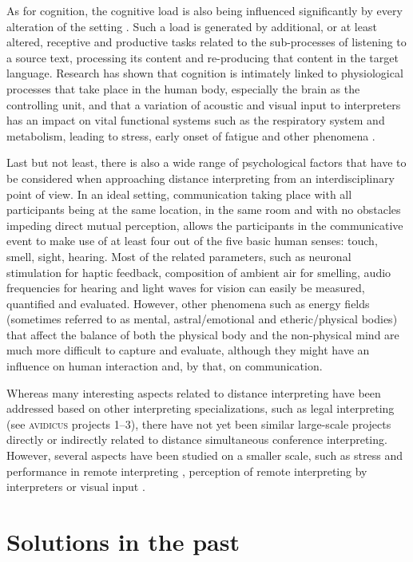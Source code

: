 \documentclass[output=paper]{langsci/langscibook}
\begin{document}
As for cognition, the cognitive load is also being influenced significantly by every alteration of the setting \citep{Moser-Mercer2005}. Such a load is generated by additional, or at least altered, receptive and productive tasks related to the sub-processes of listening to a source text, processing its content and re-producing that content in the target language. Research has shown that cognition is intimately linked to physiological processes that take place in the human body, especially the brain as the controlling unit, and that a variation of acoustic and visual input to interpreters has an impact on vital functional systems such as the respiratory system and metabolism, leading to stress, early onset of fatigue and other phenomena \citep{Moser-Mercer2003}.

Last but not least, there is also a wide range of psychological factors that have to be considered when approaching distance interpreting from an interdisciplinary point of view. In an ideal setting, communication taking place with all participants being at the same location, in the same room and with no obstacles impeding direct mutual perception, allows the participants in the communicative event to make use of at least four out of the five basic human senses: touch, smell, sight, hearing. Most of the related parameters, such as neuronal stimulation for haptic feedback, composition of ambient air for smelling, audio frequencies for hearing and light waves for vision can easily be measured, quantified and evaluated. However, other phenomena such as energy fields (sometimes referred to as mental, astral/emotional and etheric/physical bodies) that affect the balance of both the physical body and the non-physical mind are much more difficult to capture and evaluate, although they might have an influence on human interaction and, by that, on communication.

Whereas many interesting aspects related to distance interpreting have been addressed based on other interpreting specializations, such as legal interpreting (see \textsc{avidicus} projects 1--3), there have not yet been similar large-scale projects directly or indirectly related to distance simultaneous conference interpreting. However, several aspects have been studied on a smaller scale, such as stress and performance in remote interpreting \citep{Moser-Mercer2003,Roziner2010}, perception of remote interpreting by interpreters \citep{Mouzourakis2006} or visual input \citep{Rennert2008,Luisetto2016}.

\section{Solutions in the past}
\label{sec:ziegler:03}
\end{document}
